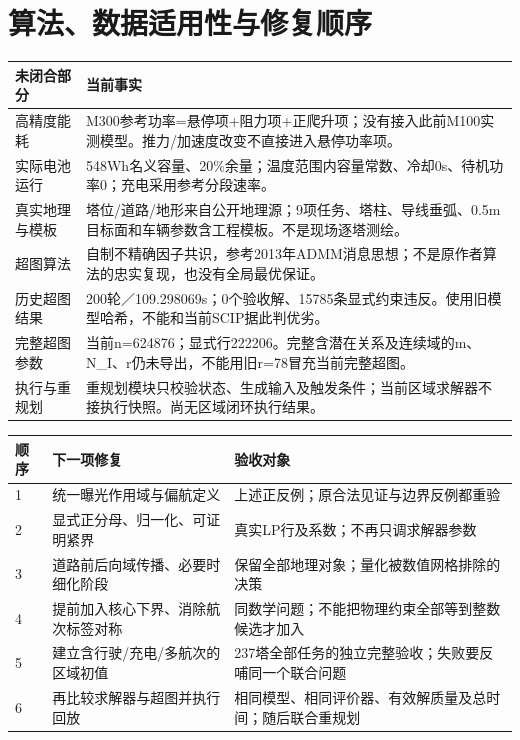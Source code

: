 \section*{算法、数据适用性与修复顺序}
\begin{center}\small\begin{tabular}{p{33mm}p{130mm}}\toprule 未闭合部分 & 当前事实\\\midrule
高精度能耗 & M300参考功率=悬停项+阻力项+正爬升项；没有接入此前M100实测模型。推力/加速度改变不直接进入悬停功率项。\\
实际电池运行 & 548Wh名义容量、20\%余量；温度范围内容量常数、冷却0s、待机功率0；充电采用参考分段速率。\\
真实地理与模板 & 塔位/道路/地形来自公开地理源；9项任务、塔柱、导线垂弧、0.5m目标面和车辆参数含工程模板。不是现场逐塔测绘。\\
超图算法 & 自制不精确因子共识，参考2013年ADMM消息思想；不是原作者算法的忠实复现，也没有全局最优保证。\\
历史超图结果 & 200轮／109.298069s；0个验收解、15785条显式约束违反。使用旧模型哈希，不能和当前SCIP据此判优劣。\\
完整超图参数 & 当前n=624876；显式行222206。完整含潜在关系及连续域的m、N\_I、r仍未导出，不能用旧r=78冒充当前完整超图。\\
执行与重规划 & 重规划模块只校验状态、生成输入及触发条件；当前区域求解器不接执行快照。尚无区域闭环执行结果。\\
\bottomrule\end{tabular}\end{center}\begin{center}\small\begin{tabular}{p{12mm}p{70mm}p{75mm}}\toprule 顺序 & 下一项修复 & 验收对象\\\midrule
1 & 统一曝光作用域与偏航定义 & 上述正反例；原合法见证与边界反例都重验\\
2 & 显式正分母、归一化、可证明紧界 & 真实LP行及系数；不再只调求解器参数\\
3 & 道路前后向域传播、必要时细化阶段 & 保留全部地理对象；量化被数值网格排除的决策\\
4 & 提前加入核心下界、消除航次标签对称 & 同数学问题；不能把物理约束全部等到整数候选才加入\\
5 & 建立含行驶/充电/多航次的区域初值 & 237塔全部任务的独立完整验收；失败要反哺同一个联合问题\\
6 & 再比较求解器与超图并执行回放 & 相同模型、相同评价器、有效解质量及总时间；随后联合重规划\\

\end{tabular}
\end{center}
